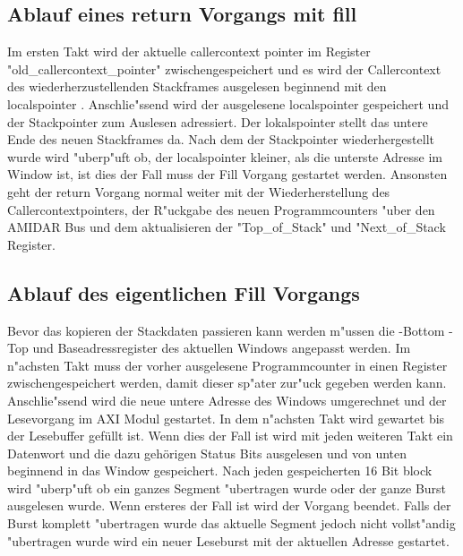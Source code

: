 \subsection{Ablauf eines return Vorgangs mit fill}
Im ersten Takt wird der aktuelle callercontext pointer im Register "old\_callercontext\_pointer" zwischengespeichert und es wird der Callercontext des wiederherzustellenden Stackframes ausgelesen beginnend mit den localspointer . 
Anschlie{"ss}end wird der ausgelesene localspointer gespeichert und der Stackpointer zum Auslesen adressiert. Der lokalspointer stellt das untere Ende des neuen Stackframes da. Nach dem der Stackpointer wiederhergestellt wurde wird "uberp"uft ob, der localspointer kleiner, als die unterste Adresse im Window ist, ist dies der Fall muss der Fill Vorgang gestartet werden.  
Ansonsten geht der return Vorgang normal weiter mit der Wiederherstellung des Callercontextpointers, der R"uckgabe des neuen Programmcounters "uber den AMIDAR Bus und dem aktualisieren der "Top\_of\_Stack" und "Next\_of\_Stack Register. 

\subsection {Ablauf des eigentlichen Fill Vorgangs}

Bevor das kopieren der Stackdaten passieren kann werden m"ussen die -Bottom -Top und Baseadressregister des aktuellen Windows angepasst werden. Im n"achsten Takt muss der vorher ausgelesene Programmcounter in einen Register zwischengespeichert werden, damit dieser sp"ater zur"uck gegeben werden kann. Anschlie{"ss}end wird die neue untere Adresse des Windows umgerechnet und der Lesevorgang im AXI Modul gestartet. In dem n"achsten Takt wird gewartet bis der Lesebuffer gefüllt ist. Wenn dies der Fall ist wird mit jeden weiteren Takt ein Datenwort und die dazu gehörigen Status Bits ausgelesen und von unten beginnend in das Window gespeichert. Nach jeden gespeicherten 16 Bit block wird "uberp"uft ob ein ganzes Segment "ubertragen wurde oder der ganze Burst ausgelesen wurde. Wenn ersteres der Fall ist wird der Vorgang beendet. Falls der Burst komplett "ubertragen wurde das aktuelle Segment jedoch nicht vollst"andig "ubertragen wurde wird ein neuer Leseburst mit der aktuellen Adresse gestartet. 

